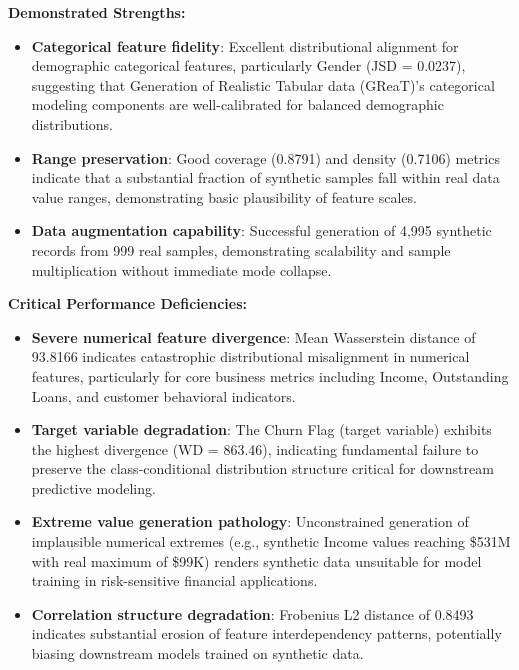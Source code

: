 \documentclass[10pt,conference,a4paper]{IEEEtran}
\begin{document}
\textbf{Demonstrated Strengths:}
\begin{itemize}
    \item \textbf{Categorical feature fidelity}: Excellent distributional alignment for demographic categorical features, particularly Gender (JSD = 0.0237), suggesting that Generation of Realistic Tabular data (GReaT)'s categorical modeling components are well-calibrated for balanced demographic distributions.
    \item \textbf{Range preservation}: Good coverage (0.8791) and density (0.7106) metrics indicate that a substantial fraction of synthetic samples fall within real data value ranges, demonstrating basic plausibility of feature scales.
    \item \textbf{Data augmentation capability}: Successful generation of 4,995 synthetic records from 999 real samples, demonstrating scalability and sample multiplication without immediate mode collapse.
\end{itemize}

\textbf{Critical Performance Deficiencies:}
\begin{itemize}
    \item \textbf{Severe numerical feature divergence}: Mean Wasserstein distance of 93.8166 indicates catastrophic distributional misalignment in numerical features, particularly for core business metrics including Income, Outstanding Loans, and customer behavioral indicators.
    \item \textbf{Target variable degradation}: The Churn Flag (target variable) exhibits the highest divergence (WD = 863.46), indicating fundamental failure to preserve the class-conditional distribution structure critical for downstream predictive modeling.
    \item \textbf{Extreme value generation pathology}: Unconstrained generation of implausible numerical extremes (e.g., synthetic Income values reaching \$531M with real maximum of \$99K) renders synthetic data unsuitable for model training in risk-sensitive financial applications.
    \item \textbf{Correlation structure degradation}: Frobenius L2 distance of 0.8493 indicates substantial erosion of feature interdependency patterns, potentially biasing downstream models trained on synthetic data.
\end{itemize}
\end{document}
